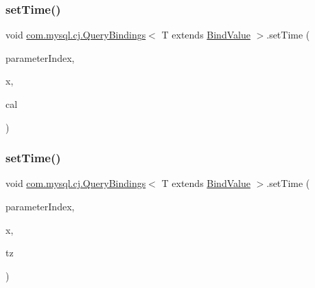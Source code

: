 \subsubsection{\texorpdfstring{set\+Time()}{setTime()}\hspace{0.1cm}{\footnotesize\ttfamily [2/3]}}
{\footnotesize\ttfamily void \mbox{\hyperlink{interfacecom_1_1mysql_1_1cj_1_1_query_bindings}{com.\+mysql.\+cj.\+Query\+Bindings}}$<$ T extends \mbox{\hyperlink{interfacecom_1_1mysql_1_1cj_1_1_bind_value}{Bind\+Value}} $>$.set\+Time (\begin{DoxyParamCaption}\item[{int}]{parameter\+Index,  }\item[{Time}]{x,  }\item[{Calendar}]{cal }\end{DoxyParamCaption})}

\mbox{\label{interfacecom_1_1mysql_1_1cj_1_1_query_bindings_a21ded062a41842f08c6f75878adfdc74}} 
\subsubsection{\texorpdfstring{set\+Time()}{setTime()}\hspace{0.1cm}{\footnotesize\ttfamily [3/3]}}
{\footnotesize\ttfamily void \mbox{\hyperlink{interfacecom_1_1mysql_1_1cj_1_1_query_bindings}{com.\+mysql.\+cj.\+Query\+Bindings}}$<$ T extends \mbox{\hyperlink{interfacecom_1_1mysql_1_1cj_1_1_bind_value}{Bind\+Value}} $>$.set\+Time (\begin{DoxyParamCaption}\item[{int}]{parameter\+Index,  }\item[{Time}]{x,  }\item[{Time\+Zone}]{tz }\end{DoxyParamCaption})}

\mbox{\label{interfacecom_1_1mysql_1_1cj_1_1_query_bindings_ad61211668a8f9590103454e6b3b3b127}} 
